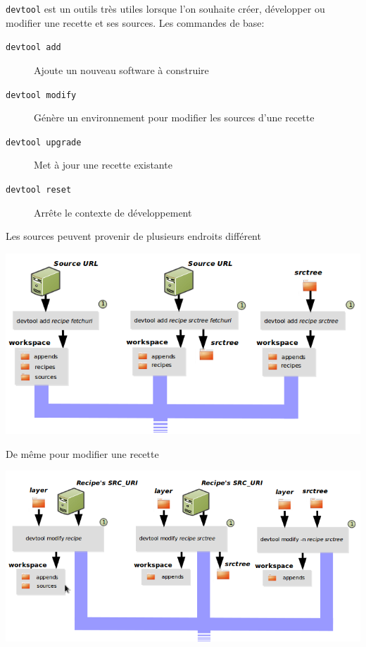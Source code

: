 \documentclass[compress]{beamer}
\begin{document}
\begin{frame}
\texttt{devtool} est un outils très utiles lorsque l'on souhaite créer, développer ou modifier une recette et ses sources.\newline
\newline
Les commandes de base:
\begin{description}
	\item[\texttt{devtool add}] Ajoute un nouveau software à construire
	\item[\texttt{devtool modify}] Génère un environnement pour modifier les sources d'une recette
	\item[\texttt{devtool upgrade}] Met à jour une recette existante
	\item[\texttt{devtool reset}] Arrête le contexte de développement
\end{description}
\end{frame}

\begin{frame}
Les sources peuvent provenir de plusieurs endroits différent
\begin{center}
	\includegraphics[width=1\textwidth]{images/devtool-add-src.png}
\end{center}
\end{frame}

\begin{frame}
De même pour modifier une recette
\begin{center}
	\includegraphics[width=1\textwidth]{images/devtool-modify-src.png}
\end{center}
\end{frame}
\end{document}

